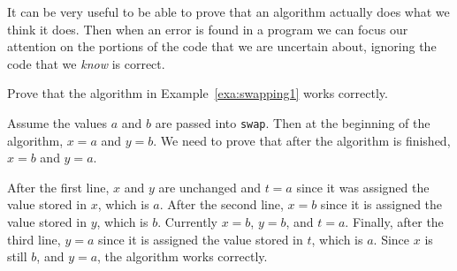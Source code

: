It can be very useful to be able to prove that an algorithm actually does what we think it does.
Then when an error is found in a program we can focus our attention on the portions of the code
that we are uncertain about, ignoring the code that we {\em know} is correct.

\begin{exa}
Prove that the algorithm in Example~\ref{exa:swapping1} works correctly.
\begin{pf}
Assume the values $a$ and $b$ are passed into \verb+swap+.  Then at the beginning of the algorithm,
$x=a$ and $y=b$.  We need to prove that after the algorithm is finished, $x=b$ and $y=a$.

After the first line, $x$ and $y$ are unchanged and $t=a$ since it was
assigned the value stored in $x$, which is $a$.  After the second line, $x=b$ since it is assigned
the value stored in $y$, which is $b$.  Currently $x=b$, $y=b$, and $t=a$.  Finally, after the 
third line, $y=a$ since it is assigned the value stored in $t$, which is $a$.  Since $x$ is still $b$,
and $y=a$, the algorithm works correctly. 
\end{pf}
\end{exa}


